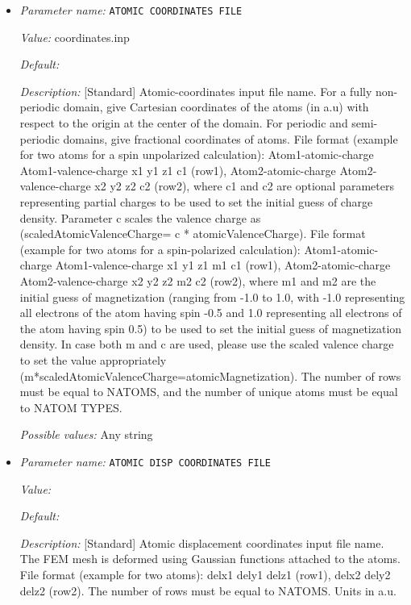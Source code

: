 \begin{itemize}
\item {\it Parameter name:} {\tt ATOMIC COORDINATES FILE}
\label{parameters:Geometry/ATOMIC COORDINATES FILE}
\label{parameters:Geometry/ATOMIC_20COORDINATES_20FILE}


{\it Value:} coordinates.inp


{\it Default:} 


{\it Description:} [Standard] Atomic-coordinates input file name. For a fully non-periodic domain, give Cartesian coordinates of the atoms (in a.u) with respect to the origin at the center of the domain. For periodic and semi-periodic domains, give fractional coordinates of atoms. File format (example for two atoms for a spin unpolarized calculation): Atom1-atomic-charge Atom1-valence-charge x1 y1 z1 c1 (row1), Atom2-atomic-charge Atom2-valence-charge x2 y2 z2 c2 (row2), where c1 and c2 are optional parameters representing partial charges to be used to set the initial guess of charge density. Parameter c scales the valence charge as (scaledAtomicValenceCharge= c * atomicValenceCharge). File format (example for two atoms for a spin-polarized calculation): Atom1-atomic-charge Atom1-valence-charge x1 y1 z1 m1 c1 (row1), Atom2-atomic-charge Atom2-valence-charge x2 y2 z2 m2 c2 (row2), where m1 and m2 are the initial guess of magnetization (ranging from -1.0 to 1.0, with -1.0 representing all electrons of the atom having spin -0.5 and 1.0 representing all electrons of the atom having spin 0.5) to be used to set the initial guess of magnetization density. In case both m and c are used, please use the scaled valence charge to set the value appropriately (m*scaledAtomicValenceCharge=atomicMagnetization). The number of rows must be equal to NATOMS, and the number of unique atoms must be equal to NATOM TYPES.


{\it Possible values:} Any string
\item {\it Parameter name:} {\tt ATOMIC DISP COORDINATES FILE}
\label{parameters:Geometry/ATOMIC DISP COORDINATES FILE}
\label{parameters:Geometry/ATOMIC_20DISP_20COORDINATES_20FILE}


{\it Value:} 


{\it Default:} 


{\it Description:} [Standard] Atomic displacement coordinates input file name. The FEM mesh is deformed using Gaussian functions attached to the atoms. File format (example for two atoms): delx1 dely1 delz1 (row1), delx2 dely2 delz2 (row2). The number of rows must be equal to NATOMS. Units in a.u.



\end{itemize}
